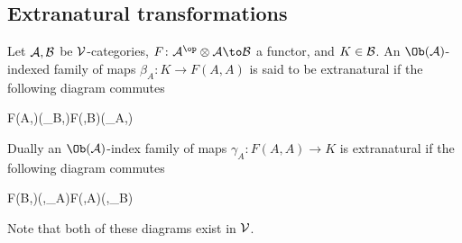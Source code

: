 \subsection{Extranatural transformations}

\bdefn

    Let ${{\cal A}},{{\cal B}}$ be ${{\cal V}}$-categories, $F\colon\A^\op\otimes\A\to\B$ a functor, and $K\in{{\cal B}}$.
    An $\Ob(\A)$-indexed family of maps $\beta_A\colon K\to F(A,A)$ is said to be {\emphcolor extranatural}
    if the following diagram commutes

        {F(A,\bul)}{\B(\beta_B,\id)}{F(\bul,B)}{\B(\beta_A,\id)}

    Dually an $\Ob(\A)$-index family of maps $\gamma_A\colon F(A,A)\to K$ is {\emphcolor extranatural} if the following
    diagram commutes

        {F(B,\bul)}{\B(\id,\gamma_A)}{F(\bul,A)}{\B(\id,\gamma_B)}

    Note that both of these diagrams exist in ${{\cal V}}$.

\edefn

